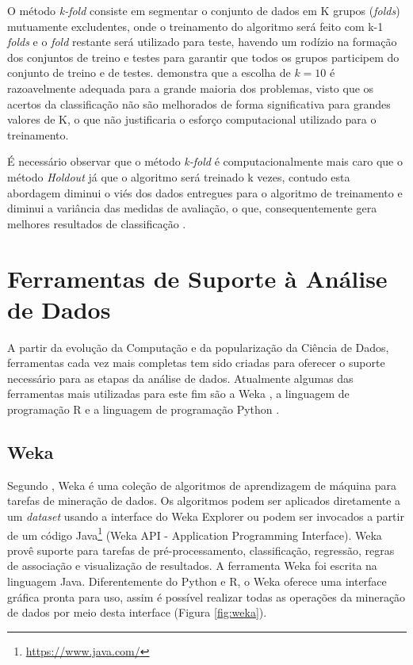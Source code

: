 O método \emph{k-fold} consiste em segmentar o conjunto de dados em K grupos (\emph{folds}) mutuamente excludentes, onde o treinamento do algoritmo será feito com k-1 \emph{folds} e o \emph{fold} restante será utilizado para teste, havendo um rodízio na formação dos conjuntos de treino e testes para garantir que todos os grupos participem do conjunto de treino e de testes.  demonstra que a escolha de $k = 10$ é razoavelmente adequada para a grande maioria dos problemas, visto que os acertos da classificação não são melhorados de forma significativa para grandes valores de K, o que não justificaria o esforço computacional utilizado para o treinamento.

É necessário observar que o método \emph{k-fold} é computacionalmente mais caro que o método \emph{Holdout} já que o algoritmo será treinado k vezes, contudo esta abordagem diminui o viés dos dados entregues para o algoritmo de treinamento e diminui a variância das medidas de avaliação, o que, consequentemente gera melhores resultados de classificação .


\section{Ferramentas de Suporte à Análise de Dados}

A partir da evolução da Computação e da popularização da Ciência de Dados, ferramentas cada vez mais completas tem sido criadas para oferecer o suporte necessário para as etapas da análise de dados. Atualmente algumas das ferramentas mais utilizadas para este fim são a Weka \cite{Hall2009}, a linguagem de programação R \cite{r2018} e a linguagem de programação Python \cite{python2018}.

\subsection{Weka}

Segundo , Weka é uma coleção de algoritmos de aprendizagem de máquina para tarefas de mineração de dados. Os algoritmos podem ser aplicados diretamente a um \textit{dataset} usando a interface do Weka Explorer ou podem ser invocados a partir de um código Java\footnote{\url{https://www.java.com/}} (Weka API - Application Programming Interface). Weka provê suporte para tarefas de  pré-processamento, classificação, regressão, regras de associação e visualização de resultados. A ferramenta Weka foi escrita na linguagem  Java. Diferentemente do Python e R, o Weka oferece uma interface gráfica pronta para uso, assim é possível realizar todas as operações da mineração de dados por meio desta interface (Figura \ref{fig:weka}).

